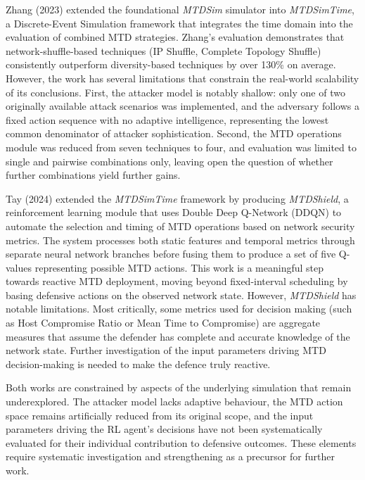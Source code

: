 \documentclass[11pt, a4paper]{article}
\begin{document}
Zhang (2023) \cite{zhang2023} extended the foundational \textit{MTDSim} simulator \cite{MTDSim} into \textit{MTDSimTime}, a Discrete-Event Simulation framework that integrates the time domain into the evaluation of combined MTD strategies. Zhang's evaluation demonstrates that network-shuffle-based techniques (IP Shuffle, Complete Topology Shuffle) consistently outperform diversity-based techniques by over 130\% on average. However, the work has several limitations that constrain the real-world scalability of its conclusions. First, the attacker model is notably shallow: only one of two originally available attack scenarios was implemented, and the adversary follows a fixed action sequence with no adaptive intelligence, representing the lowest common denominator of attacker sophistication. Second, the MTD operations module was reduced from seven techniques to four, and evaluation was limited to single and pairwise combinations only, leaving open the question of whether further combinations yield further gains. 

Tay (2024) \cite{tay2024} extended the \textit{MTDSimTime} framework by producing \textit{MTDShield}, a reinforcement learning module that uses Double Deep Q-Network (DDQN) to automate the selection and timing of MTD operations based on network security metrics. The system processes both static features and temporal metrics through separate neural network branches before fusing them to produce a set of five Q-values representing possible MTD actions. This work is a meaningful step towards reactive MTD deployment, moving beyond fixed-interval scheduling by basing defensive actions on the observed network state. However, \textit{MTDShield} has notable limitations. Most critically, some metrics used for decision making (such as Host Compromise Ratio or Mean Time to Compromise) are aggregate measures that assume the defender has complete and accurate knowledge of the network state. Further investigation of the input parameters driving MTD decision-making is needed to make the defence truly reactive.

Both works are constrained by aspects of the underlying simulation that remain underexplored. The attacker model lacks adaptive behaviour, the MTD action space remains artificially reduced from its original scope, and the input parameters driving the RL agent's decisions have not been systematically evaluated for their individual contribution to defensive outcomes. These elements require systematic investigation and strengthening as a precursor for further work.
\end{document}
